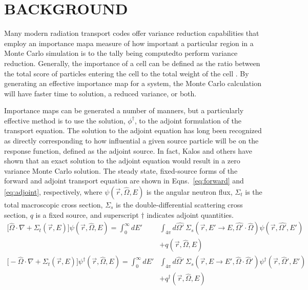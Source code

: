 \documentclass[12pt]{article}
\newcommand{\Macro}{\ensuremath{\Sigma}}
\newcommand{\vOmega}{\ensuremath{\hat{\Omega}}}
\newcommand{\rvec}{\ensuremath{\vec{r}}}
\begin{document}
%
\section{BACKGROUND}
\label{sect::second}

Many modern radiation transport codes offer variance reduction capabilities that employ an importance map\textemdash a measure of how important a particular region in a Monte Carlo simulation is to the tally being computed\textemdash to perform variance reduction. Generally, the importance of a cell can be defined as the ratio between the total score of particles entering the cell to the total weight of the cell \cite{booth_automatic_1982}. By generating an effective importance map for a system, the Monte Carlo calculation will have faster time to solution, a reduced variance, or both. 

Importance maps can be generated a number of manners, but a particularly effective method is to use the solution, $\phi^{\dagger}$, to the adjoint formulation of the transport equation. 
The solution to the adjoint equation has long been recognized as 
directly corresponding to how influential a given source particle will be on the response function, defined as the adjoint source.
In fact, Kalos \cite{kalos_importance_1963, goertzel_monte_1958} and others have shown that an exact solution to the adjoint equation would result in a zero variance Monte Carlo solution. 
%
The steady state, fixed-source forms of the forward and adjoint transport equation are shown in Eqns.~\ref{eq:forward} and \ref{eq:adjoint}, respectively, where $\psi(\vec{r}, \hat{\Omega}, E)$ is the angular neutron flux, $\Sigma_t$ is the total macroscopic cross section, $\Sigma_s$ is the double-differential scattering cross section, $q$ is a fixed source, and superscript $\dagger$ indicates adjoint quantities.
%
\begin{subequations} 
\label{eq:transport}
\begin{align}
\bigl[\hat{\Omega} \cdot \nabla + \Macro_t(\vec{r}, E)\bigr] \psi(\vec{r}, \hat{\Omega}, E)  =  \int_0^{\infty} dE' &\int_{4\pi} d\hat{\Omega'} \:\Macro_{s}(\vec{r}, E' \to E, \hat{\Omega'} \cdot \hat{\Omega}) \psi(\vec{r}, \hat{\Omega'}, E')\nonumber \\
 &+ q(\vec{r}, \vOmega, E) \label{eq:forward} \\
%
\bigl[-\vOmega \cdot \nabla + \Sigma_t(\rvec, E)\bigr] \psi^{\dagger}(\vec{r}, \vOmega, E) = \int_0^{\infty} dE' &\int_{4\pi} d\vOmega' \: \Sigma_s(\rvec, E \rightarrow E', \vOmega \cdot \vOmega') \psi^{\dagger}(\rvec, \vOmega', E') \nonumber \\
&+ q^{\dagger}(\vec{r}, \vOmega, E) \label{eq:adjoint}
\end{align}
\end{subequations}
\end{document}
